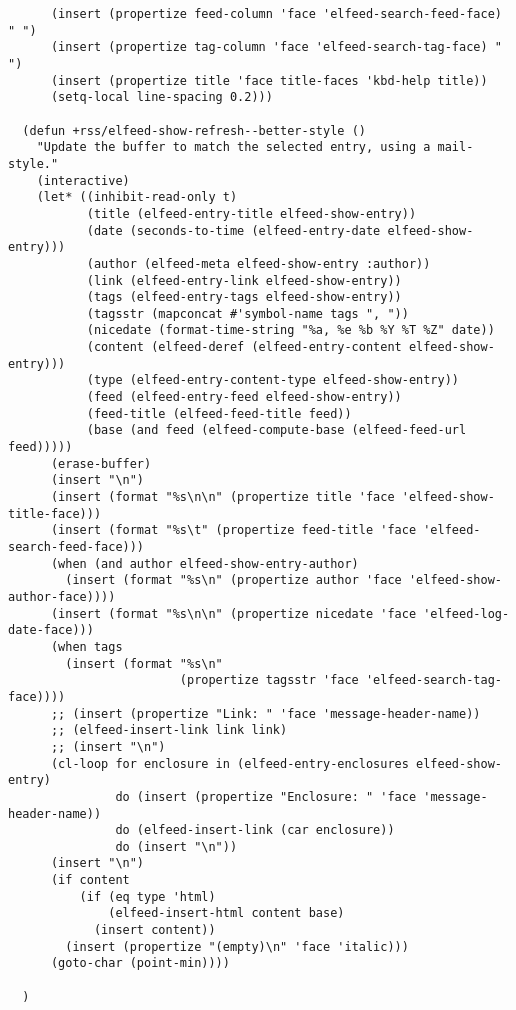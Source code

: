 \documentclass[c]{article}
\theoremstyle{plain}%
\theoremstyle{definition}
\theoremstyle{remark}
\begin{document}
\begin{verbatim}
      (insert (propertize feed-column 'face 'elfeed-search-feed-face) " ")
      (insert (propertize tag-column 'face 'elfeed-search-tag-face) " ")
      (insert (propertize title 'face title-faces 'kbd-help title))
      (setq-local line-spacing 0.2)))

  (defun +rss/elfeed-show-refresh--better-style ()
    "Update the buffer to match the selected entry, using a mail-style."
    (interactive)
    (let* ((inhibit-read-only t)
           (title (elfeed-entry-title elfeed-show-entry))
           (date (seconds-to-time (elfeed-entry-date elfeed-show-entry)))
           (author (elfeed-meta elfeed-show-entry :author))
           (link (elfeed-entry-link elfeed-show-entry))
           (tags (elfeed-entry-tags elfeed-show-entry))
           (tagsstr (mapconcat #'symbol-name tags ", "))
           (nicedate (format-time-string "%a, %e %b %Y %T %Z" date))
           (content (elfeed-deref (elfeed-entry-content elfeed-show-entry)))
           (type (elfeed-entry-content-type elfeed-show-entry))
           (feed (elfeed-entry-feed elfeed-show-entry))
           (feed-title (elfeed-feed-title feed))
           (base (and feed (elfeed-compute-base (elfeed-feed-url feed)))))
      (erase-buffer)
      (insert "\n")
      (insert (format "%s\n\n" (propertize title 'face 'elfeed-show-title-face)))
      (insert (format "%s\t" (propertize feed-title 'face 'elfeed-search-feed-face)))
      (when (and author elfeed-show-entry-author)
        (insert (format "%s\n" (propertize author 'face 'elfeed-show-author-face))))
      (insert (format "%s\n\n" (propertize nicedate 'face 'elfeed-log-date-face)))
      (when tags
        (insert (format "%s\n"
                        (propertize tagsstr 'face 'elfeed-search-tag-face))))
      ;; (insert (propertize "Link: " 'face 'message-header-name))
      ;; (elfeed-insert-link link link)
      ;; (insert "\n")
      (cl-loop for enclosure in (elfeed-entry-enclosures elfeed-show-entry)
               do (insert (propertize "Enclosure: " 'face 'message-header-name))
               do (elfeed-insert-link (car enclosure))
               do (insert "\n"))
      (insert "\n")
      (if content
          (if (eq type 'html)
              (elfeed-insert-html content base)
            (insert content))
        (insert (propertize "(empty)\n" 'face 'italic)))
      (goto-char (point-min))))

  )
\end{verbatim}
\end{document}
